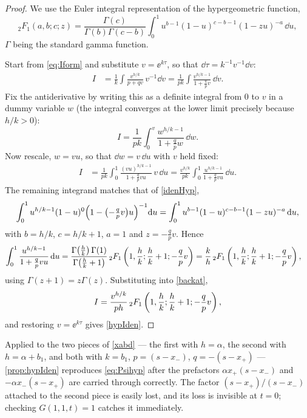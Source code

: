 \begin{proof}
We use the Euler integral representation of the hypergeometric function,
\begin{equation}
\label{idenHyp}
{}_2F_1(a,b;c;z) = \frac{\Gamma(c)}{\Gamma(b)\Gamma(c-b)}\int^1_0 u^{b-1}(1-u)^{c-b-1}(1-zu)^{-a}\,\dd u ,
\end{equation}
$\Gamma$ being the standard gamma function.

Start from \cref{eq:Iform} and substitute $v = \ee^{k\tau}$, so that
$\dd\tau = k^{-1}v^{-1}\dd v$:
\begin{align*}
I &= \frac{1}{k}\int\frac{v^{h/k}}{p+qv}\,v^{-1}\dd v
= \frac{1}{pk}\int\frac{v^{h/k-1}}{1+\frac{q}{p}v}\,\dd v .
\end{align*}
Fix the antiderivative by writing this as a definite integral from $0$ to $v$ in a
dummy variable $w$ (the integral converges at the lower limit precisely because
$h/k>0$):
\begin{equation*}
I = \frac{1}{pk}\int^v_0\frac{w^{h/k-1}}{1+\frac{q}{p}w}\,\dd w .
\end{equation*}
Now rescale, $w = vu$, so that $\dd w = v\,\dd u$ with $v$ held fixed:
\begin{align}
I &= \frac{1}{pk}\int^1_0\frac{(vu)^{h/k-1}}{1+\frac{q}{p}vu}\,v\,\dd u
= \frac{v^{h/k}}{pk}\int^1_0\frac{u^{h/k-1}}{1+\frac{q}{p}vu}\,\dd u . \label{backat}
\end{align}
The remaining integrand matches that of \cref{idenHyp},
\begin{equation*}
\int^1_0 u^{h/k-1}(1-u)^{0}\Bigl(1-\bigl(-\tfrac{q}{p}v\bigr)u\Bigr)^{-1}{\rm d} u
= \int^1_0 u^{b-1}(1-u)^{c-b-1}(1-zu)^{-a}\,{\rm d} u ,
\end{equation*}
with $b = h/k$, $c = h/k+1$, $a = 1$ and $z = -\tfrac{q}{p}v$. Hence
\begin{align*}
\int^1_0\frac{u^{h/k-1}}{1+\frac{q}{p}vu}\,{\rm d} u
&= \frac{\Gamma\!\left(\frac{h}{k}\right)\Gamma(1)}{\Gamma\!\left(\frac{h}{k}+1\right)}\,{}_2F_1\left(1,\frac{h}{k};\frac{h}{k}+1;-\frac{q}{p}v\right)
= \frac{k}{h}\,{}_2F_1\left(1,\frac{h}{k};\frac{h}{k}+1;-\frac{q}{p}v\right),
\end{align*}
using $\Gamma(z+1) = z\Gamma(z)$. Substituting into \cref{backat},
\begin{equation*}
I = \frac{v^{h/k}}{ph}\,{}_2F_1\left(1,\frac{h}{k};\frac{h}{k}+1;-\frac{q}{p}v\right),
\end{equation*}
and restoring $v = \ee^{k\tau}$ gives \cref{hypIden}.
\end{proof}

\begin{remark}
Applied to the two pieces of \cref{xabd} --- the first with $h=\alpha$, the second
with $h = \alpha+b_1$, and both with $k=b_1$, $p=(s-x_-)$, $q=-(s-x_+)$ ---
\cref{prop:hypIden} reproduces \cref{eq:Psihyp} after the prefactors
$\alpha x_+(s-x_-)$ and $-\alpha x_-(s-x_+)$ are carried through correctly. The
factor $(s-x_+)/(s-x_-)$ attached to the second piece is easily lost, and its loss is
invisible at $t=0$; checking $G(1,1,t)=1$ catches it immediately.
\end{remark}

